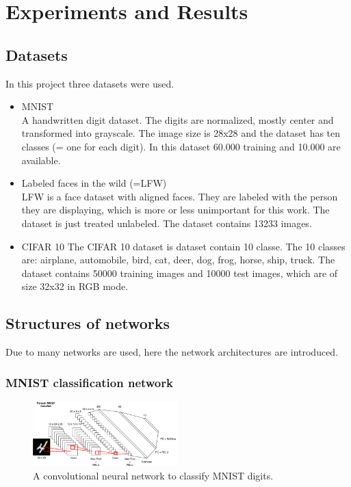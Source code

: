 \documentclass[
     11pt,         %
     a4paper,      %
     oneside,
     ]{article}
\begin{document}
\section{Experiments and Results}
\subsection{Datasets}
In this project three datasets were used.
\begin{itemize}
  \item MNIST \\
  A handwritten digit dataset. The digits are normalized, mostly center and transformed into grayscale.
  The image size is 28x28 and the dataset has ten classes (= one for each digit). In this dataset 60.000 training and 10.000 are available.
  \item Labeled faces in the wild (=LFW)\\
  LFW is a face dataset with aligned faces. They are labeled with the person they are displaying, which is more or less unimportant for this work. The dataset is just treated unlabeled. The dataset contains 13233 images.
  \item CIFAR 10
  The CIFAR 10 dataset is dataset contain 10 classe. The 10 classes are: airplane, automobile, bird, cat, deer, dog, frog, horse, ship, truck. The dataset contains 50000 training images and 10000 test images, which are of size 32x32 in RGB mode.
\end{itemize}

\subsection{Structures of networks}
Due to many networks are used, here the network architectures are introduced.
\subsubsection{MNIST classification network}
\begin{figure}[H]
  \begin{center}
    \includegraphics[width=0.5\textwidth]{images/mnist_convet.png}
    \caption{A convolutional neural network to classify MNIST digits.}
  \end{center}
\end{figure}
\end{document}
